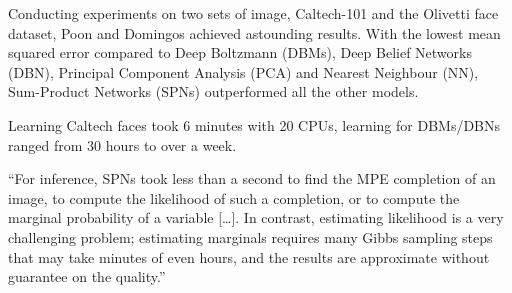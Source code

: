 \documentclass[a4paper,10pt]{article}
\theoremstyle{plain}
\begin{document}
Conducting experiments on two sets of image, Caltech-101 and the Olivetti face dataset, Poon and
Domingos achieved astounding results. With the lowest mean squared error compared to Deep Boltzmann
(DBMs), Deep Belief Networks (DBN), Principal Component Analysis (PCA) and Nearest Neighbour (NN),
Sum-Product Networks (SPNs) outperformed all the other models.

Learning Caltech faces took 6 minutes with 20 CPUs, learning for DBMs/DBNs ranged from 30 hours to
over a week.\cite{poon-domingos}

``For inference, SPNs took less than a second to find the MPE completion of an image, to compute
the likelihood of such a completion, or to compute the marginal probability of a variable [\ldots].
In contrast, estimating likelihood is a very challenging problem; estimating marginals requires
many Gibbs sampling steps that may take minutes of even hours, and the results are approximate
without guarantee on the quality.''~\cite{poon-domingos}

\begin{figure}[h]
\end{figure}
\end{document}

